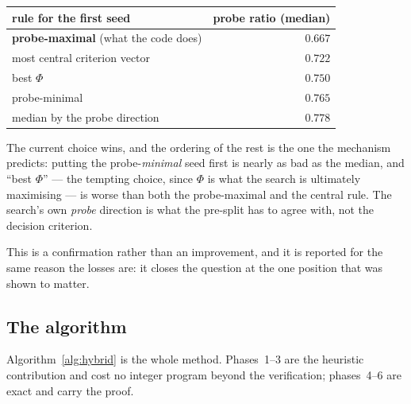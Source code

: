 \documentclass[11pt,a4paper]{article}
\begin{document}
\begin{center}
\begin{tabular}{lr}
\toprule
rule for the first seed & probe ratio (median) \\
\midrule
\textbf{probe-maximal} (what the code does) & $\mathbf{0.667}$ \\
most central criterion vector & $0.722$ \\
best $\Phi$ & $0.750$ \\
probe-minimal & $0.765$ \\
median by the probe direction & $0.778$ \\
\bottomrule
\end{tabular}
\end{center}

\noindent
The current choice wins, and the ordering of the rest is the one the mechanism
predicts: putting the probe-\emph{minimal} seed first is nearly as bad as the
median, and ``best $\Phi$'' --- the tempting choice, since $\Phi$ is what the
search is ultimately maximising --- is worse than both the probe-maximal and
the central rule.  The search's own \emph{probe} direction is what the
pre-split has to agree with, not the decision criterion.

This is a confirmation rather than an improvement, and it is reported for the
same reason the losses are: it closes the question at the one position that was
shown to matter.

\subsection{The algorithm}
\label{sec:pseudo}

Algorithm~\ref{alg:hybrid} is the whole method.  Phases~1--3 are the heuristic
contribution and cost no integer program beyond the verification;
phases~4--6 are exact and carry the proof.
\end{document}
